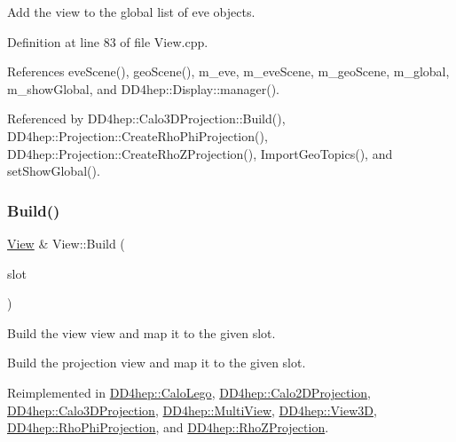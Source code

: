 Add the view to the global list of eve objects. 



Definition at line 83 of file View.\+cpp.



References eve\+Scene(), geo\+Scene(), m\+\_\+eve, m\+\_\+eve\+Scene, m\+\_\+geo\+Scene, m\+\_\+global, m\+\_\+show\+Global, and D\+D4hep\+::\+Display\+::manager().



Referenced by D\+D4hep\+::\+Calo3\+D\+Projection\+::\+Build(), D\+D4hep\+::\+Projection\+::\+Create\+Rho\+Phi\+Projection(), D\+D4hep\+::\+Projection\+::\+Create\+Rho\+Z\+Projection(), Import\+Geo\+Topics(), and set\+Show\+Global().

\hypertarget{class_d_d4hep_1_1_view_ab4e12874a9cb6a599f268b027443c6ce}{}\label{class_d_d4hep_1_1_view_ab4e12874a9cb6a599f268b027443c6ce} 
\subsubsection{\texorpdfstring{Build()}{Build()}}
{\footnotesize\ttfamily \hyperlink{class_d_d4hep_1_1_view}{View} \& View\+::\+Build (\begin{DoxyParamCaption}\item[{T\+Eve\+Window $\ast$}]{slot }\end{DoxyParamCaption})\hspace{0.3cm}{\ttfamily [virtual]}}



Build the view view and map it to the given slot. 

Build the projection view and map it to the given slot. 

Reimplemented in \hyperlink{class_d_d4hep_1_1_calo_lego_ab1ef28e69a78dbe27e6a33b1d22cc713}{D\+D4hep\+::\+Calo\+Lego}, \hyperlink{class_d_d4hep_1_1_calo2_d_projection_a4ac47f2293dd1af3b2dc1b6311edb170}{D\+D4hep\+::\+Calo2\+D\+Projection}, \hyperlink{class_d_d4hep_1_1_calo3_d_projection_a2f0865f08b8eedfc84323b8a280d1216}{D\+D4hep\+::\+Calo3\+D\+Projection}, \hyperlink{class_d_d4hep_1_1_multi_view_a7343f8ab0d599e5ee1b9b471a12a00a8}{D\+D4hep\+::\+Multi\+View}, \hyperlink{class_d_d4hep_1_1_view3_d_a8067ea1bbbbcf503e271acd7dcace79f}{D\+D4hep\+::\+View3D}, \hyperlink{class_d_d4hep_1_1_rho_phi_projection_a6a8d8e5c6a15d559da719c23eb8d7b8c}{D\+D4hep\+::\+Rho\+Phi\+Projection}, and \hyperlink{class_d_d4hep_1_1_rho_z_projection_adc2e30a682bc645b5433d055774930ef}{D\+D4hep\+::\+Rho\+Z\+Projection}.



